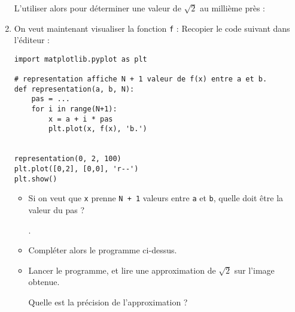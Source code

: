 \documentclass[
	classe=$2^{de}$,
]
{informatique}
\begin{document}
\begin{enumerate}
	      L'utiliser alors pour déterminer une valeur de $\sqrt{2}$ au millième près : 
	\item On veut maintenant visualiser la fonction \texttt{f} : Recopier le code suivant dans l'éditeur :
	      \begin{lstlisting}
import matplotlib.pyplot as plt

# representation affiche N + 1 valeur de f(x) entre a et b. 
def representation(a, b, N):
    pas = ...
    for i in range(N+1):
        x = a + i * pas
        plt.plot(x, f(x), 'b.')


representation(0, 2, 100)   
plt.plot([0,2], [0,0], 'r--')
plt.show()
          \end{lstlisting}
	      \begin{itemize}
		      \item Si on veut que \texttt{x} prenne \texttt{N + 1} valeurs entre \texttt{a} et \texttt{b}, quelle doit être la valeur du pas ?

		            .
		      \item Compléter alors le programme ci-dessus.
		      \item Lancer le programme, et lire une approximation de $\sqrt{2}$ sur l'image obtenue.

		            Quelle est la précision de l'approximation ? 
	      \end{itemize}
\end{enumerate}
\end{document}
